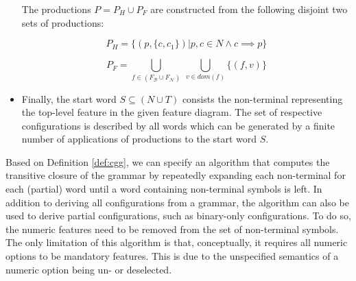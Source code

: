 \begin{definition}
\begin{itemize}
  The productions $P = P_H \cup P_F$ are constructed from the following disjoint
  two sets of productions:
  
  \begin{equation}
  P_H = \lbrace (p, \lbrace c, c_1 \rbrace) | p, c \in N \land
  c \implies p\rbrace
  \end{equation}
  
  \begin{equation}
  P_F = \bigcup_{f \in (F_\mathcal{B} \cup F_\mathcal{N})} ~ \bigcup_{v \in
  dom(f)} \lbrace (f, v) \rbrace
  \end{equation}
	
  \item Finally, the start word $S \subseteq (N \cup T)$ consists the
  non-terminal representing the top-level feature in the given feature diagram.
  The set of respective configurations is described by all words which can be
  generated by a finite number of applications of productions to the start word
  $S$.
  
  \end{itemize}
\end{definition}

Based on Definition \ref{def:cgg}, we can specify an algorithm that computes the
transitive closure of the grammar by repeatedly expanding each non-terminal for
each (partial) word until a word containing non-terminal symbols is left.
In addition to deriving all configurations from a grammar, the
algorithm can also be used to derive partial configurations, such as
binary-only configurations. To do so, the numeric features need to be removed
from the set of non-terminal symbols. The only limitation of this algorithm is
that, conceptually, it requires all numeric options to be mandatory features.
This is due to the unspecified semantics of a numeric option being un- or
deselected.

